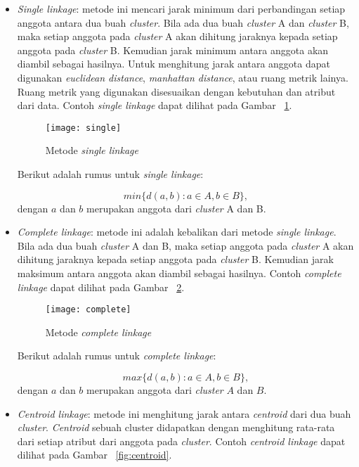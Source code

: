 \begin{itemize}

\item \textit{Single linkage}: metode ini mencari jarak minimum dari perbandingan setiap anggota antara dua buah \textit{cluster}. Bila ada dua buah \textit{cluster} A dan \textit{cluster} B, maka setiap anggota pada \textit{cluster} A akan dihitung jaraknya kepada setiap anggota pada \textit{cluster} B. Kemudian jarak minimum antara anggota akan diambil sebagai hasilnya. Untuk menghitung jarak antara anggota dapat digunakan \textit{euclidean distance}, \textit{manhattan distance}, atau ruang metrik lainya. Ruang metrik yang digunakan disesuaikan dengan kebutuhan dan atribut dari data. Contoh \textit{single linkage} dapat dilihat pada Gambar ~\ref{fig:single}. 

\begin{figure}[H]
    \centering  
    \texttt{[image: single]}  
    \caption[Metode {\it single linkage} ]{Metode {\it single linkage}} 
    \label{fig:single} 
\end{figure}

Berikut adalah rumus untuk \textit{single linkage}:

$$
min\{ d(a,b): a \in A, b \in B\}, 
$$
dengan $a$ dan $b$ merupakan anggota dari \textit{cluster} A dan B.\\

\item \textit{Complete linkage}: metode ini adalah kebalikan dari metode \textit{single linkage}. Bila ada dua buah \textit{cluster} A dan B, maka setiap anggota pada \textit{cluster} A akan dihitung jaraknya kepada setiap anggota pada \textit{cluster} B. Kemudian jarak maksimum antara anggota akan diambil sebagai hasilnya. Contoh  \textit{complete linkage} dapat dilihat pada Gambar ~\ref{fig:complete}.

\begin{figure}[H]
    \centering  
    \texttt{[image: complete]}  
    \caption[Metode {\it complete linkage} ]{Metode {\it complete linkage}} 
    \label{fig:complete} 
\end{figure}

Berikut adalah rumus untuk \textit{complete linkage}:

$$
max\{ d(a,b): a \in A, b \in B\}, 
$$
dengan $a$ dan $b$ merupakan anggota dari \textit{cluster} $A$ dan $B$.\\


\item \textit{Centroid linkage}: metode ini menghitung jarak antara \textit{centroid} dari dua buah \textit{cluster}.  \textit{Centroid} sebuah cluster didapatkan dengan menghitung rata-rata dari setiap atribut dari anggota pada \textit{cluster}. Contoh  \textit{centroid linkage} dapat dilihat pada Gambar ~\ref{fig:centroid}. 


\end{itemize}
